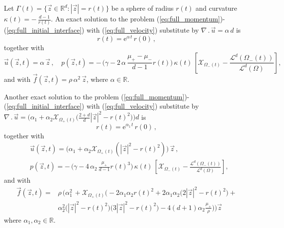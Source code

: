 \documentclass[a4paper,12pt,onecolumn]{article}
\newcommand{\R}{{\mathbb R}}
\newcommand{\bigchi}{\ensuremath{\mathrm{\mathcal{X}}}}
\newcommand{\charfcn}[1]{\bigchi_{#1}} %
\begin{document}
Let $\Gamma(t) = \{ \vec z \in \R^d : |\vec z| = r(t)\}$ be a sphere of radius
$r(t)$ and curvature $\kappa(t) = -\,\frac{d-1}{r(t)}$.
An exact solution to the problem
(\ref{eq:full_momentum})-(\ref{eq:full_initial_interface}) with
(\ref{eq:full_velocity}) substitute by $\nabla\,.\,\vec u = \alpha\,d$ is
\begin{equation} \label{eq:r_benchmark1}
r(t) = \mathrm{e}^{\alpha\,t}\,r(0)\,,
\end{equation}
together with
\begin{equation} \label{eq:up_benchmark1}
\vec u(\vec z, t) = \alpha\,\vec z \,, \quad
p(\vec z, t) = -\,\bigg(\gamma - 2\,\alpha\,\frac{\mu_+ - \mu_-}
{d-1}r(t)\bigg)\,\kappa(t)\,\left[ \charfcn{\Omega_-(t)} -
\frac{\mathcal{L}^d(\Omega_-(t))}{\mathcal{L}^d(\Omega)}\right],
\end{equation}
and with $\vec f(\vec z, t) = \rho\,\alpha^2\,\vec z$, where $\alpha \in \R$.

Another exact solution to the problem
(\ref{eq:full_momentum})-(\ref{eq:full_initial_interface}) with
(\ref{eq:full_velocity}) substitute by $\nabla\,.\,\vec u = \big( \alpha_1 +
\alpha_2\charfcn{\Omega_+(t)}\big(\frac{2+d}{d}|\vec z|^2-r(t)^2\big)\big)d$ is
\begin{equation} \label{eq:r_benchmark2}
r(t) = \mathrm{e}^{\alpha_1\,t}\,r(0)\,,
\end{equation}
together with
\begin{align} \label{eq:up_benchmark2}
& \vec u(\vec z, t) = \bigg(\alpha_1+\alpha_2\charfcn{\Omega_+(t)}(|\vec
z|^2-r(t)^2)\bigg)\,\vec z\,, \\
& p(\vec z, t) = -\,\bigg(\gamma - 4\,\alpha_2\,\frac{\mu_+}{d-1}r(t)^3
\bigg)\,\kappa(t)\,\left[ \charfcn{\Omega_-(t)} -
\frac{\mathcal{L}^d(\Omega_-(t))}{\mathcal{L}^d(\Omega)}\right],
\end{align}
and with
\begin{align}
\vec f(\vec z, t) = &
\rho\,\bigg(\alpha_1^2\,+\charfcn{\Omega_+(t)}\bigg(-2\alpha_1\alpha_2r(t)^2 +
2\alpha_1\alpha_2\big(2|\vec z|^2-r(t)^2\big)+ \nonumber \\
& \alpha_2^2\big(|\vec z|^2-r(t)^2\big)\big(3|\vec z|^2 -
r(t)^2\big)-4(d+1)\alpha_2\frac{\mu_+}{\rho}\bigg)\bigg)\vec z
\end{align}
where $\alpha_1,\alpha_2 \in \R$.
\end{document}
